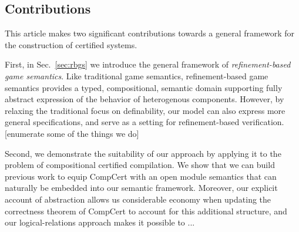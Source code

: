
\subsection{Contributions} %

This article makes two significant contributions
towards a general framework for the construction of certified systems.

First, in Sec.~\ref{sec:rbgs} we introduce the general framework of
\emph{refinement-based game semantics}.
Like traditional game semantics,
refinement-based game semantics provides
a typed, compositional, semantic domain
supporting fully abstract expression of
the behavior of heterogenous components.
However,
by relaxing the traditional focus on definability,
our model can also express more general specifications,
and serve as a setting for refinement-based verification.
[enumerate some of the things we do]

Second, we demonstrate the suitability of our approach
by applying it to the problem of compositional certified compilation.
We show that we can build previous work \cite{compcomp,sepcomp,popl15,cpp15}
to equip CompCert with an open module semantics
that can naturally be embedded into our semantic framework.
Moreover,
our explicit account of abstraction
allows us considerable economy
when updating the correctness theorem of CompCert
to account for this additional structure,
and our logical-relations approach
makes it possible to ...


\endinput

\subsection{Old stuff}

-----
The state of the art in formal verification is:
we can verify individual artefacts of decent size
(Compcert, CertiKOS, seL4, file systems, CPUs, network protocols).
But the grand challenge is figuring out
how to connect such components together
to obtain large-scale, end-to-end verified systems.
[name-drop the DeepSpec project, cyber-physical systems etc.]

In that context,
compilers are particularly interesting and relevant
because they are a ubiquitous tool
involved at many layers
in the construction of large-scale software systems.




To achieve this, we need to take
a more systematic view of
how large-scale systems are constructed and
how to reason about them,
and use that insight to
articulate design principles for
components of certified systems
and the mathematical tools we use to analyze them.

